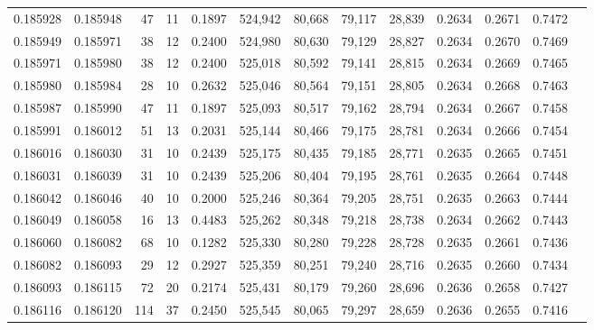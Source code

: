 \begin{tabular}{rrrrrrrrrrrrr}
0.185928 & 0.185948 &    47 &  11 &                                     0.1897 & 524,942 &  80,668 &  79,117 &  28,839 & 0.2634 & 0.2671 & 0.7472 \\
0.185949 & 0.185971 &    38 &  12 &                                     0.2400 & 524,980 &  80,630 &  79,129 &  28,827 & 0.2634 & 0.2670 & 0.7469 \\
0.185971 & 0.185980 &    38 &  12 &                                     0.2400 & 525,018 &  80,592 &  79,141 &  28,815 & 0.2634 & 0.2669 & 0.7465 \\
0.185980 & 0.185984 &    28 &  10 &                                     0.2632 & 525,046 &  80,564 &  79,151 &  28,805 & 0.2634 & 0.2668 & 0.7463 \\
0.185987 & 0.185990 &    47 &  11 &                                     0.1897 & 525,093 &  80,517 &  79,162 &  28,794 & 0.2634 & 0.2667 & 0.7458 \\
0.185991 & 0.186012 &    51 &  13 &                                     0.2031 & 525,144 &  80,466 &  79,175 &  28,781 & 0.2634 & 0.2666 & 0.7454 \\
0.186016 & 0.186030 &    31 &  10 &                                     0.2439 & 525,175 &  80,435 &  79,185 &  28,771 & 0.2635 & 0.2665 & 0.7451 \\
0.186031 & 0.186039 &    31 &  10 &                                     0.2439 & 525,206 &  80,404 &  79,195 &  28,761 & 0.2635 & 0.2664 & 0.7448 \\
0.186042 & 0.186046 &    40 &  10 &                                     0.2000 & 525,246 &  80,364 &  79,205 &  28,751 & 0.2635 & 0.2663 & 0.7444 \\
0.186049 & 0.186058 &    16 &  13 &                                     0.4483 & 525,262 &  80,348 &  79,218 &  28,738 & 0.2634 & 0.2662 & 0.7443 \\
0.186060 & 0.186082 &    68 &  10 &                                     0.1282 & 525,330 &  80,280 &  79,228 &  28,728 & 0.2635 & 0.2661 & 0.7436 \\
0.186082 & 0.186093 &    29 &  12 &                                     0.2927 & 525,359 &  80,251 &  79,240 &  28,716 & 0.2635 & 0.2660 & 0.7434 \\
0.186093 & 0.186115 &    72 &  20 &                                     0.2174 & 525,431 &  80,179 &  79,260 &  28,696 & 0.2636 & 0.2658 & 0.7427 \\
0.186116 & 0.186120 &   114 &  37 &                                     0.2450 & 525,545 &  80,065 &  79,297 &  28,659 & 0.2636 & 0.2655 & 0.7416 \\

\end{tabular}
